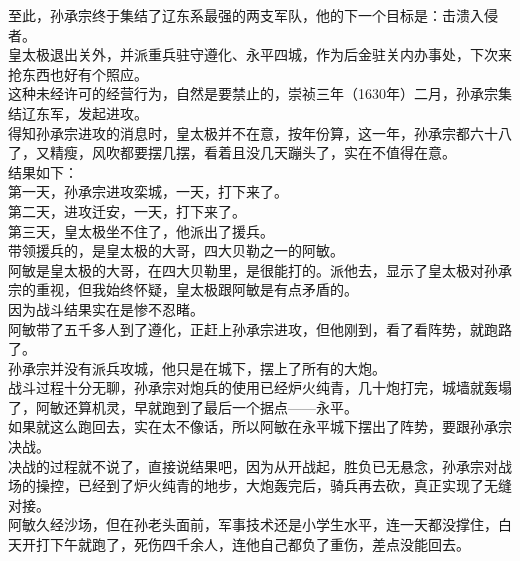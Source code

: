 \begin{multicols}{\theparacolNo}
至此，孙承宗终于集结了辽东系最强的两支军队，他的下一个目标是：击溃入侵者。\\

皇太极退出关外，并派重兵驻守遵化、永平四城，作为后金驻关内办事处，下次来抢东西也好有个照应。\\

这种未经许可的经营行为，自然是要禁止的，崇祯三年（1630年）二月，孙承宗集结辽东军，发起进攻。\\

得知孙承宗进攻的消息时，皇太极并不在意，按年份算，这一年，孙承宗都六十八了，又精瘦，风吹都要摆几摆，看着且没几天蹦头了，实在不值得在意。\\

结果如下：\\

第一天，孙承宗进攻栾城，一天，打下来了。\\

第二天，进攻迁安，一天，打下来了。\\

第三天，皇太极坐不住了，他派出了援兵。\\

带领援兵的，是皇太极的大哥，四大贝勒之一的阿敏。\\

阿敏是皇太极的大哥，在四大贝勒里，是很能打的。派他去，显示了皇太极对孙承宗的重视，但我始终怀疑，皇太极跟阿敏是有点矛盾的。\\

因为战斗结果实在是惨不忍睹。\\

阿敏带了五千多人到了遵化，正赶上孙承宗进攻，但他刚到，看了看阵势，就跑路了。\\

孙承宗并没有派兵攻城，他只是在城下，摆上了所有的大炮。\\

战斗过程十分无聊，孙承宗对炮兵的使用已经炉火纯青，几十炮打完，城墙就轰塌了，阿敏还算机灵，早就跑到了最后一个据点——永平。\\

如果就这么跑回去，实在太不像话，所以阿敏在永平城下摆出了阵势，要跟孙承宗决战。\\

决战的过程就不说了，直接说结果吧，因为从开战起，胜负已无悬念，孙承宗对战场的操控，已经到了炉火纯青的地步，大炮轰完后，骑兵再去砍，真正实现了无缝对接。\\

阿敏久经沙场，但在孙老头面前，军事技术还是小学生水平，连一天都没撑住，白天开打下午就跑了，死伤四千余人，连他自己都负了重伤，差点没能回去。\\


\end{multicols}
